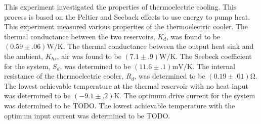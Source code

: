 

\physics

\begin{paperabs}
	
	This experiment investigated the properties of thermoelectric cooling. This
process is based on the Peltier and Seeback effects to use energy to pump heat.
This experiment measured various properties of the thermoelectric cooler.
The thermal conductance between the two reservoirs, $K_d$, was found to be $(0.59\pm.06)\si{\watt\per\kelvin}$.
The thermal conductance between the output heat sink and the ambient, $K_{hs}$, air was found to be $(7.1\pm.9)\si{\watt\per\kelvin}$.
The Seebeck coefficient for the system, $S_d$, was determined to be $(11.6\pm.1)\si{\milli\volt\per\kelvin}$.
The internal resistance of the thermoelectric cooler, $R_d$, was determined to be $(0.19\pm.01)\si{\ohm}$.
The lowest achievable temperature at the thermal reservoir with no heat input was determined to be $(-9.1\pm.2)\si{\kelvin}$.
The optimum drive current for the system was determined to be TODO.
The lowest achievable temperature with the optimum input current was determined to be TODO.
	
\end{paperabs}

